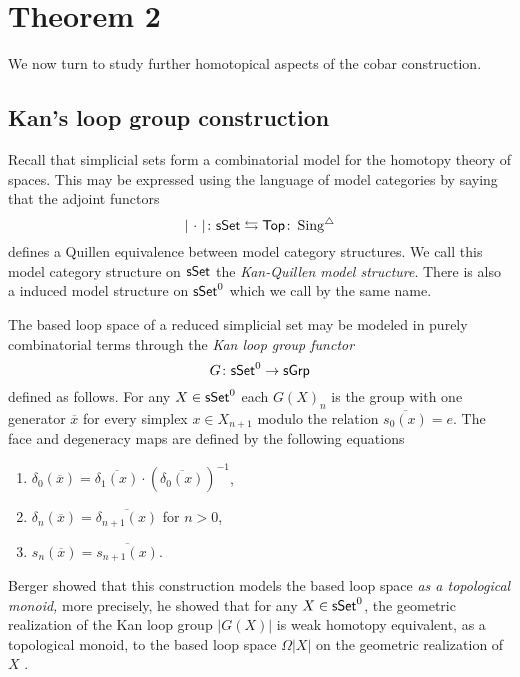 
\section{Theorem 2}

We now turn to study further homotopical aspects of the cobar construction.

\subsection{Kan's loop group construction}

Recall that simplicial sets form a combinatorial model for the homotopy theory of spaces.
This may be expressed using the language of model categories by saying that the adjoint functors
\begin{equation*}
\vert{\ \cdot\ }\vert \colon \mathsf{sSet} \leftrightarrows \mathsf{Top} \colon \operatorname{Sing^{\triangle}}
\end{equation*}
defines a Quillen equivalence between model category structures.
We call this model category structure on $\mathsf{sSet}$ the \textit{Kan-Quillen model structure}.
There is also a induced model structure on $\mathsf{sSet}^0$ which we call by the same name.

The based loop space of a reduced simplicial set may be modeled in purely combinatorial terms through the \textit{Kan loop group functor} 
\begin{equation*}
G \colon \mathsf{sSet}^0 \to \mathsf{sGrp}
\end{equation*}
defined as follows.
For any $X \in \mathsf{sSet}^0$ each $G(X)_n$ is the group with one generator $\overline{x}$ for every simplex $x \in X_{n+1}$ modulo the relation $\overline{s_0(x)} = e$.
The face and degeneracy maps are defined by the following equations
\begin{enumerate}
    \item $\delta_0(\overline{x}) = \overline{\delta_1(x)} \cdot (\overline{\delta_0(x)})^{-1}$,
    \item $\delta_n(\overline{x})= \overline{\delta_{n+1}(x)}$ for $n >0$,
    \item $s_n(\overline{x})= \overline{s_{n+1}(x)}$.
\end{enumerate}


Berger showed that this construction models the based loop space \textit{as a topological monoid,} more precisely, he showed that for any $X \in \mathsf{sSet}^0$, the geometric realization of the Kan loop group $|G(X)|$ is weak homotopy equivalent, as a topological monoid, to the based loop space $\Omega|X|$ on the geometric realization of $X$ \cite{berger1995loops}.

